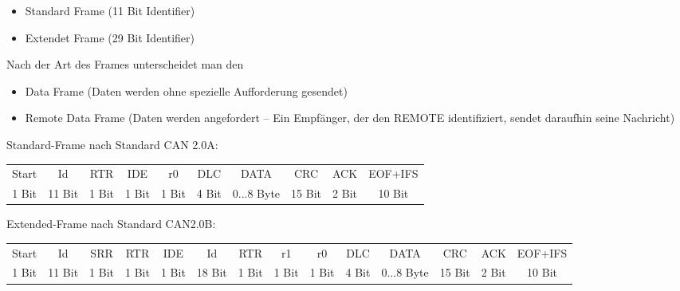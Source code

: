 \begin{itemize}
	\item Standard Frame (11 Bit Identifier)
	\item Extendet Frame (29 Bit Identifier)
\end{itemize}

Nach der Art des Frames unterscheidet man den

\begin{itemize}
	\item Data Frame (Daten werden ohne spezielle Aufforderung gesendet)
	\item Remote Data Frame (Daten werden angefordert – Ein Empfänger, der den REMOTE
	identifiziert, sendet daraufhin seine Nachricht)
\end{itemize}

Standard-Frame nach Standard CAN 2.0A:

\begin{table}[H]
	\begin{scriptsize}
	\begin{tabular}{|c|c|c|c|c|c|c|c|c|c|}
		\hline
		Start & Id & RTR   & IDE   & r0    & DLC   & DATA       & CRC    & ACK   & EOF+IFS \\
		1 Bit & 11 Bit      & 1 Bit & 1 Bit & 1 Bit & 4 Bit & 0...8 Byte & 15 Bit & 2 Bit & 10 Bit  \\ \hline
	\end{tabular}
	\end{scriptsize}
\end{table}

Extended-Frame nach Standard CAN2.0B:

\begin{table}[H]
	\begin{scriptsize}
	\begin{tabular}{|c|c|c|c|c|c|c|c|c|c|c|c|c|c|}
		\hline
		Start & Id & SRR   & RTR   & IDE   & Id & RTR   & r1    & r0    & DLC   & DATA       & CRC    & ACK   & EOF+IFS \\
		1 Bit & 11 Bit      & 1 Bit & 1 Bit & 1 Bit & 18 Bit     & 1 Bit & 1 Bit & 1 Bit & 4 Bit & 0...8 Byte & 15 Bit & 2 Bit & 10 Bit  \\ \hline
	\end{tabular}
	\end{scriptsize}
\end{table}

